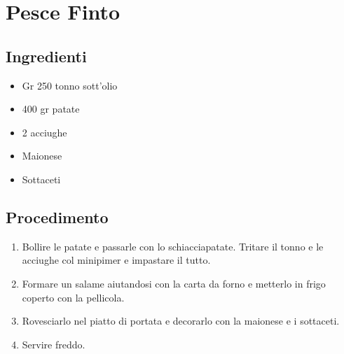 \section{Pesce Finto}
\subsection{Ingredienti}
\begin{itemize}
\item Gr 250 tonno sott'olio  
\item 400 gr patate  
\item 2 acciughe  
\item Maionese  
\item Sottaceti
\end{itemize}
\subsection{Procedimento}
\begin{enumerate}
\item  Bollire le patate e passarle con lo schiacciapatate. Tritare il tonno e le acciughe col minipimer e impastare il tutto.  
\item  Formare un salame aiutandosi con la carta da forno e metterlo in frigo coperto con la pellicola.  
\item  Rovesciarlo nel piatto di portata e decorarlo con la maionese e i sottaceti.  
\item  Servire freddo.
\end{enumerate}
